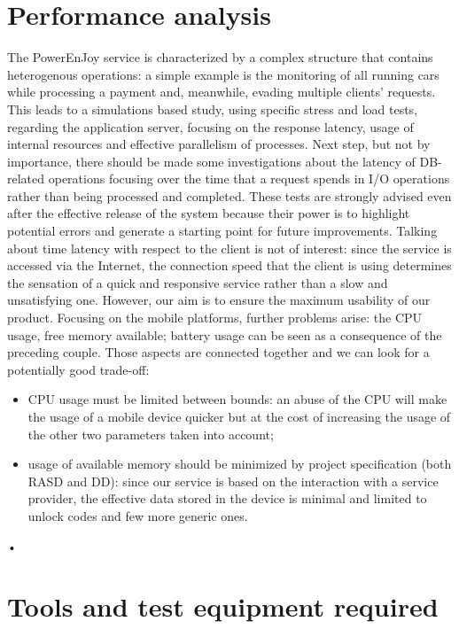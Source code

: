 \documentclass[10pt, a4paper,titlepage]{article}
\begin{document}
\section{Performance analysis}
The PowerEnJoy service is characterized by a complex structure that contains heterogenous operations: a simple example is the monitoring of all running cars while processing a payment and, meanwhile, evading multiple clients’ requests. This leads to a simulations based study, using specific stress and load tests, regarding the application server, focusing on the response latency, usage of internal resources and effective parallelism of processes. Next step, but not by importance, there should be made some investigations about the latency of DB-related operations focusing over the time that a request spends in I/O operations rather than being processed and completed. These tests are strongly advised even after the effective release of the system because their power is to highlight potential errors and generate a starting point for future improvements. Talking about time latency with respect to the client is not of interest: since the service is accessed via the Internet, the connection speed that the client is using determines the sensation of a quick and responsive service rather than a slow and unsatisfying one. However, our aim is to ensure the maximum usability of our product. Focusing on the mobile platforms, further problems arise: the CPU usage, free memory available; battery usage can be seen as a consequence of the preceding couple. Those aspects are connected together and we can look for a potentially good trade-off: 
\begin{itemize}
\item CPU usage must be limited between bounds: an abuse of the CPU will make the usage of a mobile device quicker but at the cost of increasing the usage of the other two parameters taken into account;
\item usage of available memory should be minimized by project specification (both RASD and DD): since our service is based on the interaction with a service provider, the effective data stored in the device is minimal and limited to unlock codes and few more generic ones.
\end{itemize}•
\section{Tools and test equipment required}
\end{document}
